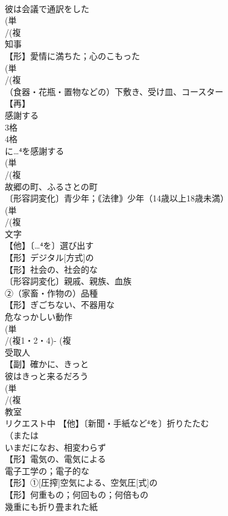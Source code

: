\documentclass[8pt]{extreport}
\begin{document}
\begin{CJK}{UTF8}{min}
\\	彼は会議で通訳をした
\\	(単
\\	/(複
\\	[州]知事 
\\	【形】愛情に満ちた；心のこもった 
\\	(単
\\	/(複
\\	（食器・花瓶・置物などの）下敷き、受け皿、コースター 
\\	【再】
\\	感謝する 
\\	3格 
\\	4格 
\\	に…⁴を感謝する
\\	(単
\\	/(複
\\	故郷の町、ふるさとの町 
\\	〔形容詞変化〕青少年；｟法律｠少年（14歳以上18歳未満） 
\\	(単
\\	/(複
\\	文字 
\\	【他】〔…⁴を〕選び出す 
\\	【形】デジタル[方式]の 
\\	【形】社会の、社会的な 
\\	〔形容詞変化〕親戚、親族、血族 
\\	②（家畜・作物の）品種
\\	【形】ぎごちない、不器用な 
\\	危なっかしい動作 
\\	(単
\\	/(複1・2・4)- (複
\\	受取人
\\	【副】確かに、きっと 
\\	彼はきっと来るだろう
\\	(単
\\	/(複
\\	教室 
\\	リクエスト中	【他】〔新聞・手紙など⁴を〕折りたたむ 
\\	（または
\\	いまだになお、相変わらず
\\	【形】電気の、電気による 
\\	電子工学の；電子的な
\\	【形】①[圧搾]空気による、空気圧[式]の 
\\	【形】何重もの；何回もの；何倍もの 
\\	幾重にも折り畳まれた紙

\end{CJK}
\end{document}
